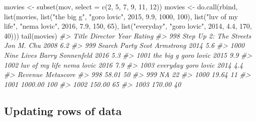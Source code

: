 \documentclass[
]{book}
\newenvironment{Shaded}{\begin{snugshade}}{\end{snugshade}}
\newcommand{\AttributeTok}[1]{\textcolor[rgb]{0.77,0.63,0.00}{#1}}
\newcommand{\CommentTok}[1]{\textcolor[rgb]{0.56,0.35,0.01}{\textit{#1}}}
\newcommand{\DecValTok}[1]{\textcolor[rgb]{0.00,0.00,0.81}{#1}}
\newcommand{\FloatTok}[1]{\textcolor[rgb]{0.00,0.00,0.81}{#1}}
\newcommand{\FunctionTok}[1]{\textcolor[rgb]{0.00,0.00,0.00}{#1}}
\newcommand{\NormalTok}[1]{#1}
\newcommand{\OtherTok}[1]{\textcolor[rgb]{0.56,0.35,0.01}{#1}}
\newcommand{\StringTok}[1]{\textcolor[rgb]{0.31,0.60,0.02}{#1}}
\begin{document}
\begin{Shaded}
\begin{Highlighting}[]
\NormalTok{movies }\OtherTok{\textless{}{-}} \FunctionTok{subset}\NormalTok{(mov, }\AttributeTok{select =} \FunctionTok{c}\NormalTok{(}\DecValTok{2}\NormalTok{, }\DecValTok{5}\NormalTok{, }\DecValTok{7}\NormalTok{, }\DecValTok{9}\NormalTok{, }\DecValTok{11}\NormalTok{, }\DecValTok{12}\NormalTok{))}
\NormalTok{movies }\OtherTok{\textless{}{-}} \FunctionTok{do.call}\NormalTok{(}\StringTok{\textquotesingle{}rbind\textquotesingle{}}\NormalTok{, }\FunctionTok{list}\NormalTok{(movies,}
                                \FunctionTok{list}\NormalTok{(}\StringTok{"the big g"}\NormalTok{, }\StringTok{"goro lovic"}\NormalTok{, }\DecValTok{2015}\NormalTok{, }\FloatTok{9.9}\NormalTok{, }\DecValTok{1000}\NormalTok{, }\DecValTok{100}\NormalTok{), }
                                \FunctionTok{list}\NormalTok{(}\StringTok{"luv of my life"}\NormalTok{, }\StringTok{"nema lovic"}\NormalTok{, }\DecValTok{2016}\NormalTok{, }\FloatTok{7.9}\NormalTok{, }\DecValTok{150}\NormalTok{, }\DecValTok{65}\NormalTok{), }
                                \FunctionTok{list}\NormalTok{(}\StringTok{"everyday"}\NormalTok{, }\StringTok{"goro lovic"}\NormalTok{, }\DecValTok{2014}\NormalTok{, }\FloatTok{4.4}\NormalTok{, }\DecValTok{170}\NormalTok{, }\DecValTok{40}\NormalTok{)))}
\FunctionTok{tail}\NormalTok{(movies)}
\CommentTok{\#\textgreater{}                       Title         Director Year Rating}
\CommentTok{\#\textgreater{} 998  Step Up 2: The Streets       Jon M. Chu 2008    6.2}
\CommentTok{\#\textgreater{} 999            Search Party   Scot Armstrong 2014    5.6}
\CommentTok{\#\textgreater{} 1000             Nine Lives Barry Sonnenfeld 2016    5.3}
\CommentTok{\#\textgreater{} 1001              the big g       goro lovic 2015    9.9}
\CommentTok{\#\textgreater{} 1002         luv of my life       nema lovic 2016    7.9}
\CommentTok{\#\textgreater{} 1003               everyday       goro lovic 2014    4.4}
\CommentTok{\#\textgreater{}      Revenue Metascore}
\CommentTok{\#\textgreater{} 998    58.01        50}
\CommentTok{\#\textgreater{} 999       NA        22}
\CommentTok{\#\textgreater{} 1000   19.64        11}
\CommentTok{\#\textgreater{} 1001 1000.00       100}
\CommentTok{\#\textgreater{} 1002  150.00        65}
\CommentTok{\#\textgreater{} 1003  170.00        40}
\end{Highlighting}
\end{Shaded}

\hypertarget{updating-rows-of-data}{%
\subsection{Updating rows of data}\label{updating-rows-of-data}}
\end{document}
